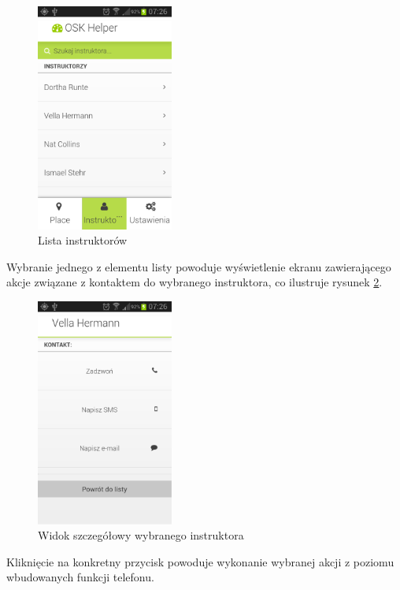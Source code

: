 \documentclass[twoside,a4paper,openright,12pt]{book}
\begin{document}
\begin{figure}[H]
\centering
\includegraphics[width=0.4\textwidth]{screenshots/android/lista_instruktorow.png}
\caption{Lista instruktorów}
\label{fig:Lista_instruktorow_mobile}
\end{figure}

Wybranie jednego z elementu listy powoduje wyświetlenie ekranu zawierającego akcje związane z kontaktem do wybranego instruktora, co ilustruje rysunek \ref{fig:Instruktor_mobile}.

\begin{figure}[H]
\centering
\includegraphics[width=0.4\textwidth]{screenshots/android/widok_szczegolowy_instruktora.png}
\caption{Widok szczegółowy wybranego instruktora}
\label{fig:Instruktor_mobile}
\end{figure}

Kliknięcie na konkretny przycisk powoduje wykonanie wybranej akcji z poziomu wbudowanych funkcji telefonu.
\end{document}
